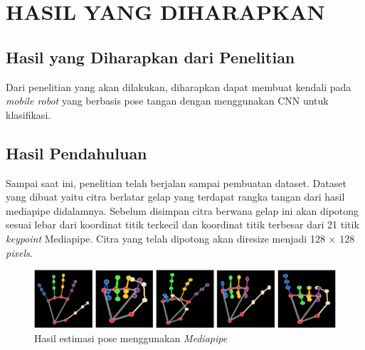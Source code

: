 \chapter{HASIL YANG DIHARAPKAN}

\section{Hasil yang Diharapkan dari Penelitian}

Dari penelitian yang akan dilakukan, diharapkan dapat membuat kendali pada \textit{mobile robot} yang berbasis pose tangan dengan menggunakan CNN untuk klasifikasi.

\section{Hasil Pendahuluan}
Sampai saat ini, penelitian telah berjalan sampai pembuatan dataset. Dataset yang dibuat yaitu citra berlatar gelap yang terdapat rangka tangan dari hasil mediapipe didalamnya. Sebelum disimpan citra berwana gelap ini akan dipotong sesuai lebar dari koordinat titik terkecil dan koordinat titik terbesar dari 21 titik \textit{keypoint} Mediapipe. Citra yang telah dipotong akan diresize menjadi 128 $\times$ 128 \textit{pixels}.

\begin{figure}[!h]
	\centering
	\includegraphics[width=1\linewidth]{gambar/hasilpose.png}
	\caption{Hasil estimasi pose menggunakan \textit{Mediapipe}}
	\label{fig:gambar41}
\end{figure}
